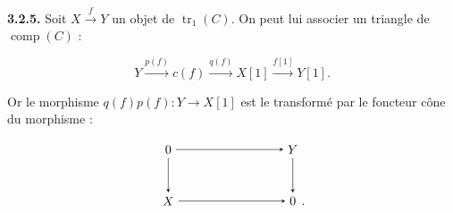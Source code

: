 \noindent\textbf{3.2.5.}\quad
Soit $X\xrightarrow{f}Y$ un objet de $\operatorname{tr}_1(C)$. On peut lui
associer un triangle de $\operatorname{comp}(C)$ :

\begin{equation}
  Y\xrightarrow{p(f)}c(f)\xrightarrow{q(f)}X[1]
  \xrightarrow{f[1]}Y[1].
  \tag{3.2.5.1}
\end{equation}

Or le morphisme $q(f)p(f)\colon Y\longrightarrow X[1]$ est le transformé par
le foncteur cône du morphisme :

\begin{equation*}
  \begin{tikzpicture}[>=stealth,baseline=(current bounding box.center)]
    \node (Z1) at (0,1.45) {$0$};
    \node (Y)  at (3.5,1.45) {$Y$};
    \node (X)  at (0,0) {$X$};
    \node (Z2) at (3.5,0) {$0$};
    \node[anchor=base west,inner sep=0pt,xshift=.08em] at (Z2.base east) {$.$};
    \draw[->] (Z1) -- (Y);
    \draw[->] (Z1) -- (X);
    \draw[->] (Y) -- (Z2);
    \draw[->] (X) -- (Z2);
  \end{tikzpicture}
\end{equation*}
